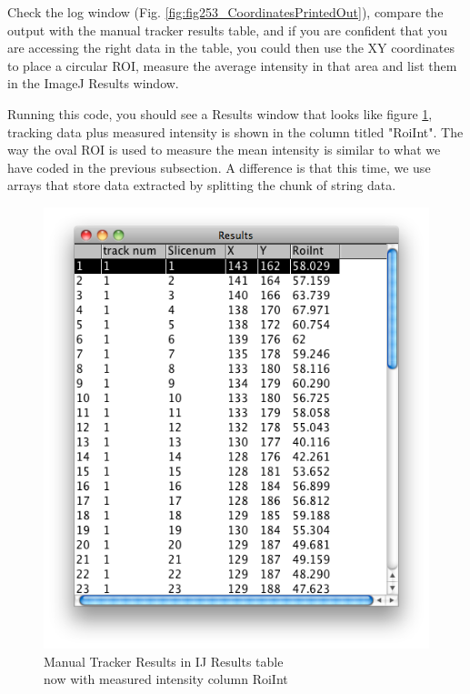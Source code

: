 \documentclass[11pt,a4paper,oneside]{report}
\begin{document}
Check the log window (Fig. \ref{fig:fig253_CoordinatesPrintedOut}), 
compare the output with the manual tracker results table, and if you are confident that you are accessing the right data in the table, 
you could then use the XY coordinates to place a circular ROI, 
measure the average intensity in that area and list them in the ImageJ Results window.



Running this code, you should see a Results window that looks like figure 
\ref{fig:fig262_ManualTrackIntfinalResults}, tracking data plus measured intensity is shown in 
the column titled "RoiInt". The way the oval ROI is used to measure the mean intensity is similar to what 
we have coded in the previous subsection. A difference is that this time, we use arrays that store data 
extracted by splitting the chunk of string data. 

\begin{figure}[htbp]
\begin{center}
\includegraphics[scale=0.5]{fig/fig262_ManualTrackIntensityFinalResults.png}
\caption{ Manual Tracker Results in IJ Results table\\ now with measured intensity column RoiInt}
\label{fig:fig262_ManualTrackIntfinalResults}
\end{center}
\end{figure}
\end{document}
